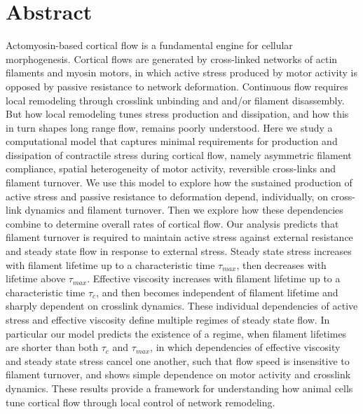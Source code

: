 \documentclass[10pt,letterpaper]{article}
\begin{document}
\section*{Abstract}
Actomyosin-based cortical flow is a fundamental engine for cellular morphogenesis.  Cortical flows are generated by cross-linked networks of actin filaments and myosin motors, in which active stress produced by motor activity is opposed by passive resistance to network deformation.  Continuous flow requires local remodeling through crosslink unbinding and and/or filament disassembly. But how local remodeling tunes stress production and dissipation, and how this in turn shapes long range flow, remains poorly understood. Here we study a computational model that captures minimal requirements for production and dissipation of contractile stress during cortical flow, namely asymmetric filament compliance, spatial heterogeneity of motor activity, reversible cross-links and filament turnover.  We use this model to explore how the sustained production of active stress and passive resistance to deformation depend, individually, on cross-link dynamics and filament turnover.  Then we explore how these dependencies combine to determine overall rates of cortical flow. Our analysis predicts that filament turnover is required to maintain active stress against external resistance and steady state flow in response to external stress. Steady state stress increases with filament lifetime up to a characteristic time $\tau_{max}$, then decreases with lifetime above $\tau_{max}$.   Effective viscosity increases with filament lifetime up to a characteristic time $\tau_c$, and then becomes independent of filament lifetime and sharply dependent on crosslink dynamics.  These individual dependencies of active stress and effective viscosity define multiple regimes of steady state flow.  In particular our model predicts the existence of a regime, when filament lifetimes are shorter than both $\tau_c$ and $\tau_{max}$, in which dependencies of effective viscosity and steady state stress cancel one another, such that flow speed is insensitive to filament turnover, and shows simple dependence on motor activity and crosslink dynamics.  These results provide a framework for understanding how animal cells tune cortical flow through local control of network remodeling.

\end{document}
